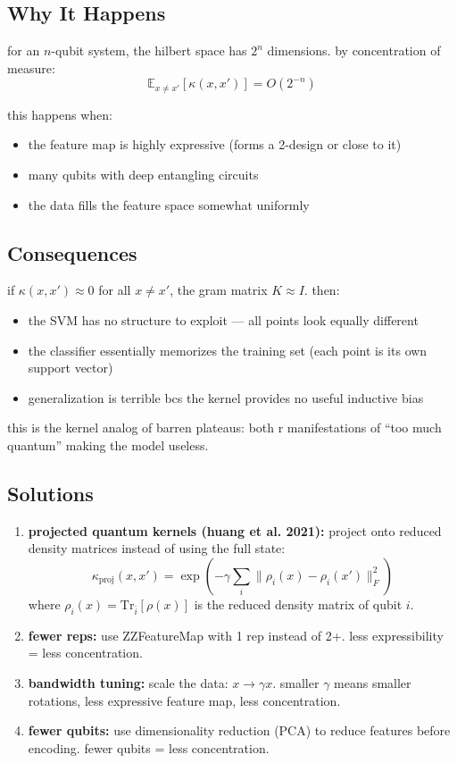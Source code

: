 \documentclass[11pt,a4paper]{article}
\theoremstyle{definition}
\theoremstyle{remark}
\begin{document}
\subsection{Why It Happens}

for an $n$-qubit system, the hilbert space has $2^n$ dimensions. by concentration of measure:
\[
\mathbb{E}_{x \neq x'}[\kappa(x, x')] = O(2^{-n})
\]

this happens when:
\begin{itemize}
    \item the feature map is highly expressive (forms a 2-design or close to it)
    \item many qubits with deep entangling circuits
    \item the data fills the feature space somewhat uniformly
\end{itemize}

\subsection{Consequences}

if $\kappa(x,x') \approx 0$ for all $x \neq x'$, the gram matrix $K \approx I$. then:
\begin{itemize}
    \item the SVM has no structure to exploit --- all points look equally different
    \item the classifier essentially memorizes the training set (each point is its own support vector)
    \item generalization is terrible bcs the kernel provides no useful inductive bias
\end{itemize}

this is the kernel analog of barren plateaus: both r manifestations of ``too much quantum'' making the model useless.

\subsection{Solutions}

\begin{enumerate}
    \item \textbf{projected quantum kernels (huang et al. 2021):} project onto reduced density matrices instead of using the full state:
    \[
    \kappa_{\text{proj}}(x,x') = \exp\left(-\gamma \sum_i \|\rho_i(x) - \rho_i(x')\|_F^2\right)
    \]
    where $\rho_i(x) = \text{Tr}_{\bar{i}}[\rho(x)]$ is the reduced density matrix of qubit $i$.

    \item \textbf{fewer reps:} use ZZFeatureMap with 1 rep instead of 2+. less expressibility = less concentration.

    \item \textbf{bandwidth tuning:} scale the data: $x \to \gamma x$. smaller $\gamma$ means smaller rotations, less expressive feature map, less concentration.

    \item \textbf{fewer qubits:} use dimensionality reduction (PCA) to reduce features before encoding. fewer qubits = less concentration.
\end{enumerate}
\end{document}

